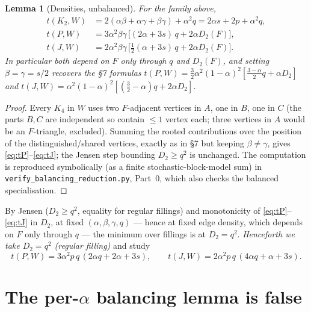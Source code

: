 \documentclass[11pt]{amsart}
\newtheorem{lemma}[theorem]{Lemma}
\theoremstyle{definition}
\begin{document}
\begin{lemma}[Densities, unbalanced]
\label{lem:densities}
For the family above,
\begin{align}
   t(K_2,W) &= 2(\alpha\beta+\alpha\gamma+\beta\gamma)+\alpha^2 q
            = 2\alpha s+2p+\alpha^2 q,\\
   t(P,W)   &= 3\alpha^2\beta\gamma\,\bigl[(2\alpha+3s)\,q+2\alpha D_2(F)\bigr],
            \label{eq:tP}\\
   t(J,W)   &= 2\alpha^2\beta\gamma\,\bigl[\tfrac12(\alpha+3s)\,q+2\alpha D_2(F)\bigr].
            \label{eq:tJ}
\end{align}
In particular both depend on $F$ only through $q$ and $D_2(F)$, and setting
$\beta=\gamma=s/2$ recovers the \S7 formulas
$t(P,W)=\tfrac32\alpha^2(1-\alpha)^2[\tfrac{3-\alpha}{2}q+\alpha D_2]$ and
$t(J,W)=\alpha^2(1-\alpha)^2[(\tfrac32-\alpha)q+2\alpha D_2]$.
\end{lemma}

\begin{proof}
Every $K_4$ in $W$ uses two $F$-adjacent vertices in $A$, one in $B$, one in
$C$ (the parts $B,C$ are independent so contain $\le1$ vertex each; three
vertices in $A$ would be an $F$-triangle, excluded).  Summing the rooted
contributions over the position of the distinguished/shared vertices, exactly
as in \S7 but keeping $\beta\ne\gamma$, gives \eqref{eq:tP}--\eqref{eq:tJ};
the Jensen step bounding $D_2\ge q^2$ is unchanged.  The computation is
reproduced symbolically (as a finite stochastic-block-model sum) in
\texttt{verify\_balancing\_reduction.py}, Part~0, which also checks the
balanced specialisation.
\end{proof}

By Jensen ($D_2\ge q^2$, equality for regular fillings) and monotonicity of
\eqref{eq:tP}--\eqref{eq:tJ} in $D_2$, at fixed $(\alpha,\beta,\gamma,q)$ ---
hence at fixed edge density, which depends on $F$ only through $q$ --- the
minimum over fillings is at $D_2=q^2$.  \emph{Henceforth we take $D_2=q^2$
(regular filling)} and study
\begin{equation}
\label{eq:Treg}
   t(P,W)=3\alpha^2 p\,q\,(2\alpha q+2\alpha+3s),\qquad
   t(J,W)=2\alpha^2 p\,q\,(4\alpha q+\alpha+3s).
\end{equation}

\section{The per-$\alpha$ balancing lemma is false}
\label{sec:counter}
\end{document}
